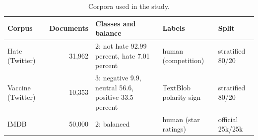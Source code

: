 \begin{table}[t]
\centering
\caption{Corpora used in the study.}
\label{tab:corpora}
\footnotesize\setlength{\tabcolsep}{4pt}
\begin{tabular}{lrp{4.6cm}p{2.6cm}l}
\toprule
Corpus & Documents & Classes and balance & Labels & Split \\
\midrule
Hate (Twitter) & 31,962 & 2: not hate 92.99 percent, hate 7.01 percent & human (competition) & stratified 80/20 \\
Vaccine (Twitter) & 10,353 & 3: negative 9.9, neutral 56.6, positive 33.5 percent & TextBlob polarity sign & stratified 80/20 \\
IMDB & 50,000 & 2: balanced & human (star ratings) & official 25k/25k \\
\bottomrule
\end{tabular}
\end{table}
